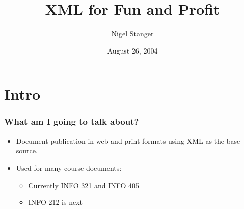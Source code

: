 %
%
%
%


\usepackage{beamerthemenzcs}
\usepackage{graphicx}
\usepackage{listings}
\usepackage{calc}
\usepackage[absolute,overlay]{textpos}
\usepackage[normalem]{ulem}


\renewcommand{\ttdefault}{blg}
\lstset{basicstyle=\ttfamily,showstringspaces=false}


\graphicspath{{images/}}


\setlength{\TPHorizModule}{1cm}
\setlength{\TPVertModule}{1cm}



\footerright{\insertframenumber}

\author{Nigel Stanger}
\title{\textbf{XML for Fun and Profit}}
\date{August 26, 2004}







\frame{\titlepage}




\section*{Intro}




\frame
{
	\frametitle{What am I going to talk about?}
	
	\begin{itemize}
	
		\item Document publication in web and print formats using XML
		as the base source.
		
		\item Used for many course documents:
		
		\begin{itemize}
		
			\item Currently INFO 321 and INFO 405
			
			\item INFO 212 is next
			
		\end{itemize}
	
	\end{itemize}
}


